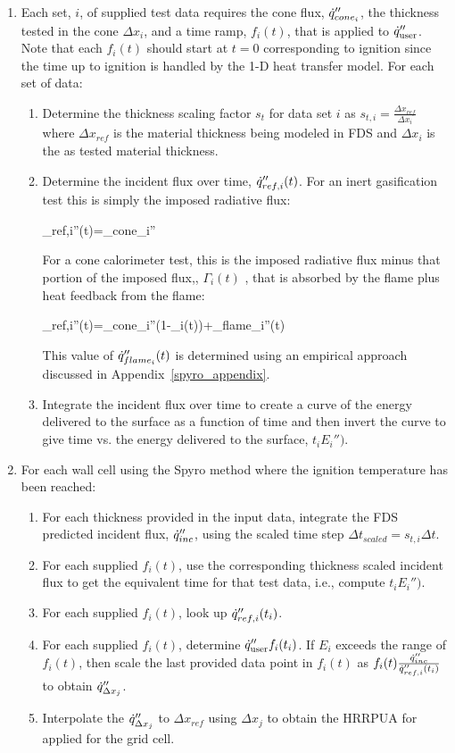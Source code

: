\begin{enumerate}
	\item Each set, $i$, of supplied test data requires the cone flux, $\dot{q}_{cone_i}''$, the thickness tested in the cone ${\Delta x_i}$, and a time ramp, $f_i(t)$, that is applied to $\dot{q}_{\rm user}''$. Note that each $f_i(t)$ should start at $t=0$ corresponding to ignition since the time up to ignition is handled by the 1-D heat transfer model. For each set of data:
	\begin{enumerate}
		\item Determine the thickness scaling factor $s_t$ for data set $i$ as $s_{t,i} = \frac{\Delta x_{ref}}{\Delta x_i}$ where $\Delta x_{ref}$ is the material thickness being modeled in FDS and $\Delta x_i$ is the as tested material thickness.
		\item Determine the incident flux over time, $\dot{q}_{ref,i}''(t)$. For an inert gasification test this is simply the imposed radiative flux:
		
		\be  \dq_{ref,i}''(t)=\dq_{cone_i}'' \ee
		
		For a cone calorimeter test, this is the imposed radiative flux minus that portion of the imposed flux,, $\Gamma_i(t)$ , that is absorbed by the flame plus heat feedback from the flame:
		
		\be \dq_{ref,i}''(t)=\dq_{cone_i}''(1-\Gamma_i(t))+\dq_{flame_i}''(t) \ee
		
		This value of $\dot{q}_{flame_i}''(t)$ is determined using an empirical approach discussed in Appendix~\ref{spyro_appendix}.
		\item Integrate the incident flux over time to create a curve of the energy delivered to the surface as a function of time and then invert the curve to give time vs. the energy delivered to the surface, $t_i{E_i'')}$.
	\end{enumerate}
	\item For each wall cell using the Spyro method where the ignition temperature has been reached:
	\begin{enumerate}
		\item For each thickness provided in the input data, integrate the FDS predicted incident flux, $\dot{q}_{inc}''$, using the scaled time step $\Delta t_{scaled}=s_{t,i} \Delta t$.
		\item For each supplied $f_i(t)$, use the corresponding thickness scaled incident flux to get the equivalent time for that test data, i.e., compute $t_i{E_i'')}$.
		\item For each supplied $f_i(t)$, look up $\dot{q}_{ref,i}''(t_i)$.
		\item For each supplied $f_i(t)$, determine $\dot{q}_{\rm user}''f_i(t_i)$. If ${E_i}$ exceeds the range of  $f_i(t)$, then scale the last provided data point in $f_i(t)$ as $ f_i(t) \frac{\dot{q}_{inc}''}{\dot{q}_{ref,i}''(t_i)}$ to obtain $\dot{q}_{\Delta x_j}''$.
		\item Interpolate the $\dot{q}_{\Delta x_j}''$ to $\Delta x_{ref}$ using $\Delta x_j$ to obtain the HRRPUA for applied for the grid cell.
	\end{enumerate}
\end{enumerate}



